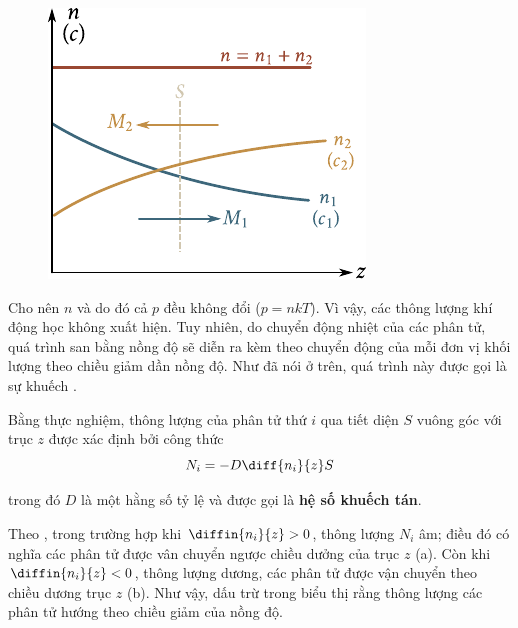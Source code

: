 \begin{figure}[!htb]
	\begin{center}
		\includegraphics[scale=1]{figures/ch_16/fig_16_1.pdf}
		\caption[]{}
		\label{fig:16_1}
	\end{center}
\end{figure}

Cho nên $n$ và do đó cả $p$ đều không đổi ($p=nkT$). Vì vậy, các thông lượng khí động học không xuất hiện. Tuy nhiên, do chuyển động nhiệt của các phân tử, quá trình san bằng nồng độ sẽ diễn ra kèm theo chuyển động của mỗi đơn vị khối lượng theo chiều giảm dần nồng độ. Như đã nói ở trên, quá trình này được gọi là sự khuếch .

Bằng thực nghiệm, thông lượng của phân tử thứ $i$ qua tiết diện $S$ vuông góc với trục $z$ được xác định bởi công thức
\begin{equation}\label{eq:16_1}
    N_i = -D \diff{n_i}{z} S
\end{equation}

\noindent
trong đó $D$ là một hằng số tỷ lệ và được gọi là \textbf{hệ số khuếch tán}.

Theo , trong trường hợp khi $\diffin{n_i}{z}>0$, thông lượng $N_i$ âm; điều đó có nghĩa các phân tử được vân chuyển ngược chiều dưởng của trục $z$ (a). Còn khi $\diffin{n_i}{z}<0$, thông lượng dương, các phân tử được vận chuyển theo chiều dương trục $z$ (b). Như vậy, dấu trừ trong  biểu thị rằng thông lượng các phân tử hướng theo chiều giảm của nồng độ.

